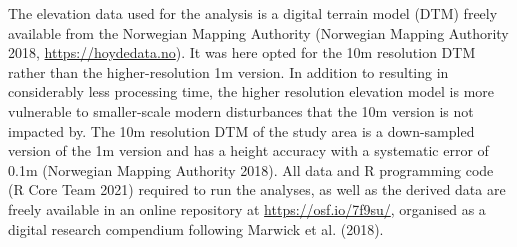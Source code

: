 \documentclass[
]{article}
\begin{document}
The elevation data used for the analysis is a digital terrain model (DTM) freely available from the Norwegian Mapping Authority (Norwegian Mapping Authority 2018, \url{https://hoydedata.no}). It was here opted for the 10m resolution DTM rather than the higher-resolution 1m version. In addition to resulting in considerably less processing time, the higher resolution elevation model is more vulnerable to smaller-scale modern disturbances that the 10m version is not impacted by. The 10m resolution DTM of the study area is a down-sampled version of the 1m version and has a height accuracy with a systematic error of 0.1m (Norwegian Mapping Authority 2018). All data and R programming code (R Core Team 2021) required to run the analyses, as well as the derived data are freely available in an online repository at \url{https://osf.io/7f9su/}, organised as a digital research compendium following Marwick et al. (2018).
\end{document}
